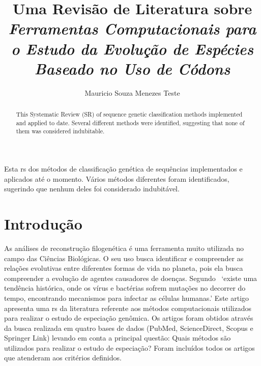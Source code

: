 \documentclass[12pt]{article}
\title{Uma Revisão de Literatura sobre \textit{Ferramentas Computacionais para
        o Estudo da Evolução de Espécies Baseado no Uso de Códons}}
\author{Mauricio Souza Menezes Teste\\}
\begin{document}

\maketitle

\begin{resumo}
    Esta \gls{rs} dos métodos de classificação genética de sequências implementados e aplicados até o momento. Vários métodos diferentes foram identificados, sugerindo que nenhum deles foi considerado indubitável.
\end{resumo}

\begin{abstract}
    \begin{otherlanguage}{english}
        This Systematic Review (SR) of sequence genetic classification methods implemented and applied to date. Several different methods were identified, suggesting that none of them was considered indubitable.
    \end{otherlanguage}
\end{abstract}

\section{Introdução}

As análises de reconstrução filogenética é uma ferramenta muito utilizada no campo das Ciências Biológicas. O seu uso busca identificar e compreender as relações evolutivas entre diferentes formas de vida no planeta, pois ela busca compreender a evolução de agentes causadores de doenças.
Segundo~\cite{behl_threat_2022} `existe uma tendência histórica, onde os vírus e bactérias sofrem mutações no decorrer do tempo, encontrando mecanismos para infectar as células humanas.'
Este artigo apresenta uma \gls{rs} da literatura referente aos métodos computacionais utilizados para realizar o estudo de especiação genômica. Os artigos foram obtidos através da busca realizada em quatro bases de dados (PubMed, ScienceDirect, Scopus e Springer Link) levando em conta a principal questão: Quais métodos são utilizados para realizar o estudo de especiação? Foram incluídos todos os artigos que atenderam aos critérios definidos.
\end{document}

